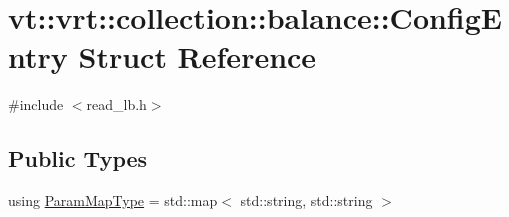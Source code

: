\hypertarget{structvt_1_1vrt_1_1collection_1_1balance_1_1_config_entry}{}\section{vt\+:\+:vrt\+:\+:collection\+:\+:balance\+:\+:Config\+Entry Struct Reference}
\label{structvt_1_1vrt_1_1collection_1_1balance_1_1_config_entry}


{\ttfamily \#include $<$read\+\_\+lb.\+h$>$}

\subsection*{Public Types}
\begin{DoxyCompactItemize}
\item 
using \hyperlink{structvt_1_1vrt_1_1collection_1_1balance_1_1_config_entry_a23bc47f965b2069f4015c839a9e1f66d}{Param\+Map\+Type} = std\+::map$<$ std\+::string, std\+::string $>$
\end{DoxyCompactItemize}
